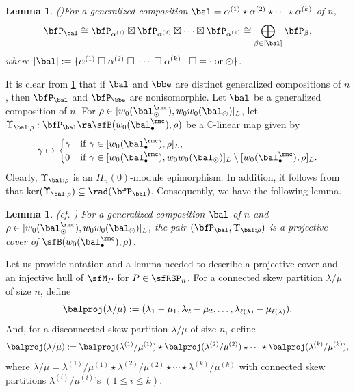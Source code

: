 \documentclass[12pt, reqno]{amsart}
\newtheorem{lemma}[theorem]{Lemma}
\theoremstyle{definition}
\numberwithin{equation}{section} \numberwithin{figure}{section}
\numberwithin{table}{section}
\def\C{\mathbb C}
\begin{document}
\begin{lemma}{\rm (\cite[Theorem 3.3]{16Huang})}\label{lem: Huang decomp gen Pa}
For a generalized composition $\bal = \alpha^{(1)} \star \alpha^{(2)} \star \cdots \star \alpha^{(k)}$ of $n$,
\[
\bfP_\bal 
\cong 
\bfP_{\alpha^{(1)}} \boxtimes \bfP_{\alpha^{(2)}} \boxtimes \cdots \boxtimes \bfP_{\alpha^{(k)}}
\cong
\bigoplus_{\beta \in [\bal]} \bfP_\beta,
\]
where $[\bal] := \{\alpha^{(1)} \; \square \; \alpha^{(2)} \; \square \; \cdots \; \square \; \alpha^{(k)} \mid \square = \cdot \; \text{or} \; \odot  \}$.
\end{lemma}




It is clear from \cref{lem: Huang decomp gen Pa} that if $\bal$ and $\bbe$ are distinct generalized compositions of $n$, then 
$\bfP_\bal$ and $\bfP_\bbe$ are nonisomorphic.   
Let $\bal$ be a generalized composition of $n$.
For $\rho \in [w_0(\bal_\odot^\rmc), w_0 w_0(\bal_\odot)]_L$,
let $\Upsilon_{\bal;\rho}: \bfP_{\bal} \ra \sfB(w_0(\bal_\bullet^\rmc), \rho)$ be a $\C$-linear map  given by
\[
\gamma \mapsto 
\begin{cases}
\gamma & \text{if $\gamma \in [w_0(\bal_\bullet^\rmc), \rho]_L$,}\\
0 & \text{if $\gamma \in [w_0(\bal_\bullet^\rmc), w_0 w_0(\bal_\odot)]_L \setminus [w_0(\bal_\bullet^\rmc), \rho]_L$.}
\end{cases}
\]
Clearly, $\Upsilon_{\bal;\rho}$ is an $H_n(0)$-module epimorphism.
In addition, it follows from~\cite[Lemma 6.2]{22KY} that $\ker(\Upsilon_{\bal;\rho}) \subseteq \rad (\bfP_\bal)$.
Consequently, we have the following lemma.





\begin{lemma}\label{lem: radical cond}{\rm (cf. \cite[Lemma 6.2]{22KY})}
For a generalized composition $\bal$ of $n$ and $\rho \in [w_0(\bal_\odot^\rmc), w_0 w_0(\bal_\odot)]_L$,
the pair $(\bfP_\bal, \Upsilon_{\bal;\rho})$ is a projective cover of $\sfB(w_0(\bal_\bullet^\rmc), \rho)$.
\end{lemma}








Let us provide  notation and a lemma needed to describe a projective cover and an injective hull of $\sfM_P$ for $P \in \sfRSP_n$. 
For a connected skew partition $\lambda / \mu$ of size $n$, define
\[
\balproj(\lambda/\mu) := (\lambda_1 - \mu_1, \lambda_2 - \mu_2, \ldots , \lambda_{\ell(\lambda)} - \mu_{\ell(\lambda)}).
\]
And, for a disconnected skew partition $\lambda / \mu$ of size $n$, define
\[
\balproj(\lambda/\mu) := \balproj(\lambda^{(1)} / \mu^{(1)}) 
\star \balproj(\lambda^{(2)} / \mu^{(2)})
\star \cdots \star
\balproj(\lambda^{(k)} / \mu^{(k)}),
\]
where $\lambda/\mu = \lambda^{(1)} / \mu^{(1)} \star \lambda^{(2)} / \mu^{(2)} \star \cdots \star \lambda^{(k)} / \mu^{(k)}$ with connected skew partitions $\lambda^{(i)} / \mu^{(i)}$'s $(1\le i \le k)$.
\end{document}
